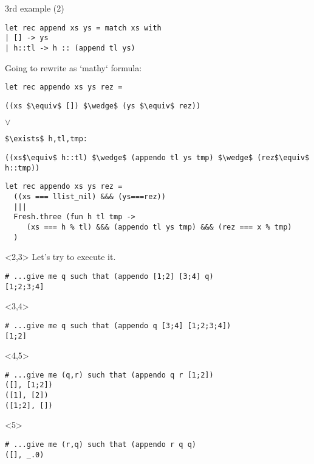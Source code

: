 \documentclass [mathserif]{beamer}
\theoremstyle{definition}
\begin{document}
\begin{frame}[fragile]{3rd example  (2)}
\begin{verbatim}
let rec append xs ys = match xs with
| [] -> ys
| h::tl -> h :: (append tl ys)
\end{verbatim}

Going to rewrite as `mathy` formula:

\begin{verbatim}
let rec appendo xs ys rez =
\end{verbatim}
\vspace{-.5cm}
\begin{lstlisting}[mathescape,frame=none]
  ((xs $\equiv$ []) $\wedge$ (ys $\equiv$ rez))\end{lstlisting}
\vspace{-.2cm}
$\vee$
\vspace{-.2cm}
\begin{lstlisting}[mathescape,frame=none]
  $\exists$ h,tl,tmp: \end{lstlisting}
\vspace{-.4cm}
\begin{lstlisting}[mathescape,frame=none]
    ((xs$\equiv$ h::tl) $\wedge$ (appendo tl ys tmp) $\wedge$ (rez$\equiv$ h::tmp))
\end{lstlisting}
\end{frame}

\begin{frame}[fragile]{}

\begin{lstlisting}
let rec appendo xs ys rez = 
  ((xs === llist_nil) &&& (ys===rez))
  |||
  Fresh.three (fun h tl tmp ->
     (xs === h % tl) &&& (appendo tl ys tmp) &&& (rez === x % tmp) 
  )
\end{lstlisting}
\begin{onlyenv}<2,3>
Let's try to execute it.
\begin{verbatim}
# ...give me q such that (appendo [1;2] [3;4] q)
[1;2;3;4]
\end{verbatim}
\end{onlyenv}

\begin{onlyenv}<3,4>
\begin{verbatim}
# ...give me q such that (appendo q [3;4] [1;2;3;4])
[1;2]
\end{verbatim}
\end{onlyenv}

\begin{onlyenv}<4,5>
\begin{verbatim}
# ...give me (q,r) such that (appendo q r [1;2])
([], [1;2])
([1], [2])
([1;2], [])
\end{verbatim}
\end{onlyenv}

\begin{onlyenv}<5>
\begin{verbatim}
# ...give me (r,q) such that (appendo r q q)
([], _.0)
\end{verbatim}
\end{onlyenv}
\end{frame}
\end{document}
